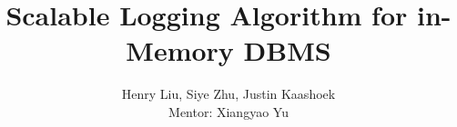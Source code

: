 \documentclass[12pt]{article}
\begin{document}
\doublespacing

\title{Scalable Logging Algorithm for in-Memory DBMS}

\author{Henry Liu, Siye Zhu, Justin Kaashoek \\ Mentor: Xiangyao Yu}

\maketitle










\newpage


\end{document}
